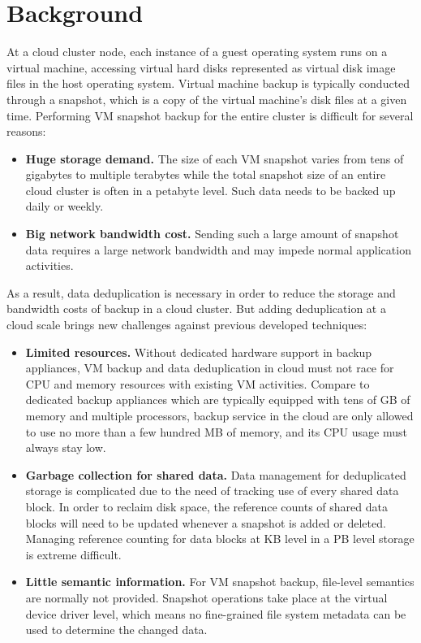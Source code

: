 \chapter{Background}
\label{chap:back}

At a cloud cluster node, each instance of a guest operating 
system runs on a virtual machine, accessing virtual hard disks 
represented as virtual disk image files in the host operating system.
Virtual machine backup is typically conducted through a snapshot,
which is a copy of the virtual machine's disk files at a given time.
Performing VM snapshot backup for the entire cluster is difficult 
for several reasons: 
\begin{itemize}
\item \textbf{Huge storage demand.} The size of each VM snapshot varies from tens of gigabytes to multiple 
terabytes while the total snapshot size of an entire cloud cluster is often  in a petabyte level.
Such data needs to be backed up daily or weekly.
\item \textbf{Big network bandwidth cost.} Sending such a large amount of snapshot data requires
a large network bandwidth and may impede normal application activities.
\end{itemize}

As a result, data deduplication is necessary in order to reduce the storage and bandwidth
costs of backup in a cloud cluster. But adding deduplication at a cloud scale brings new
challenges against previous developed techniques:
\begin{itemize}
\item \textbf{Limited resources.} Without dedicated hardware support in backup appliances, 
VM backup and data deduplication in cloud must not race for CPU and memory resources with
existing VM activities. Compare to dedicated backup appliances which are typically equipped with
tens of GB of memory and  multiple processors, backup service in the cloud are only allowed to use
no more than a few hundred MB of memory, and its CPU usage must always stay low.
\item \textbf{Garbage collection for shared data.} Data management for deduplicated storage
is complicated due to the need of tracking use of every shared data block. In order to reclaim
disk space, the reference counts of
shared data blocks will need to be updated whenever a snapshot is added or deleted.
Managing reference counting for data blocks at KB level in a PB level storage is extreme difficult.
\item \textbf{Little semantic information.} For VM snapshot backup, file-level semantics are normally not provided.
Snapshot operations take place at the virtual device driver level, which
means no fine-grained file system metadata can be used to determine the changed data. 
\end{itemize}

